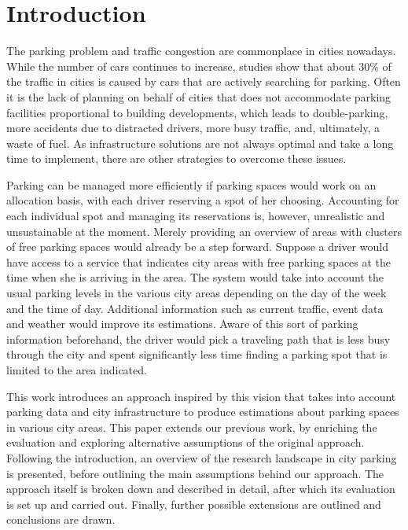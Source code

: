 \documentclass{article}
\newcommand{\cmmnt}[1]{\ignorespaces}
\begin{document}
	\cmmnt{TODO abstract}
	\section{Introduction}
	The parking problem and traffic congestion are commonplace in cities nowadays. While the number of cars continues to increase\cmmnt{ref}, studies show that about 30\% of the traffic in cities is caused by cars that are actively searching for parking\cmmnt{ref}. Often it is the lack of planning on behalf of cities that does not accommodate parking facilities proportional to building developments\cmmnt{search ref}, which leads to double-parking, more accidents due to distracted drivers, more busy traffic, and, ultimately, a waste of fuel. As infrastructure solutions are not always optimal and take a long time to implement, there are other strategies to overcome these issues.
	
	Parking can be managed more efficiently if parking spaces would work on an allocation basis, with each driver reserving a spot of her choosing. Accounting for each individual spot and managing its reservations is, however, unrealistic and unsustainable at the moment. Merely providing an overview of areas with clusters of free parking spaces would already be a step forward. Suppose a driver would have access to a service that indicates city areas with free parking spaces at the time when she is arriving in the area. The system would take into account the usual parking levels in the various city areas depending on the day of the week and the time of day. Additional information such as current traffic, event data and weather would improve its estimations. Aware of this sort of parking information beforehand, the driver would pick a traveling path that is less busy through the city and spent significantly less time finding a parking spot that is limited to the area indicated.
	
	This work introduces an approach inspired by this vision that takes into account parking data and city infrastructure to produce estimations about parking spaces in various city areas. This paper extends our previous work\cmmnt{ref}, by enriching the evaluation and exploring alternative assumptions of the original approach. Following the introduction, an overview of the research landscape in city parking is presented, before outlining the main assumptions behind our approach. The approach itself is broken down and described in detail, after which its evaluation is set up and carried out. Finally, further possible extensions are outlined and conclusions are drawn.
\end{document}
